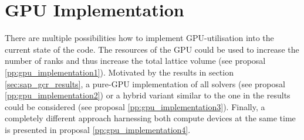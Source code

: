 \documentclass{article}
\theoremstyle{plain} %
\theoremstyle{convention} %
\theoremstyle{remark} %
\numberwithin{equation}{section}
\begin{document}
\newpage

\section{GPU Implementation}

There are multiple possibilities how to implement GPU-utilisation into the current state of the code. The resources of the GPU could be used to increase the number of ranks and thus increase the total lattice volume (see proposal \ref{pp:gpu_implementation1}). Motivated by the results in section \ref{sec:sap_gcr_results}, a pure-GPU implementation of all solvers (see proposal \ref{pp:gpu_implementation2}) or a hybrid variant similar to the one in the results could be considered (see proposal \ref{pp:gpu_implementation3}). Finally, a completely different approach harnessing both compute devices at the same time is presented in proposal \ref{pp:gpu_implementation4}.
\end{document}
